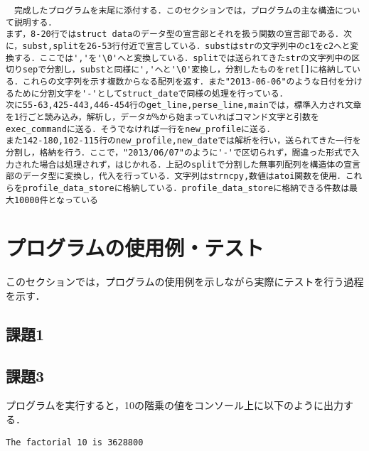 \documentclass[a4j]{jarticle}
\begin{document}
\begin{enumerate}
\begin{verbatim}
　完成したプログラムを末尾に添付する．このセクションでは，プログラムの主な構造について説明する．
まず，8-20行ではstruct dataのデータ型の宣言部とそれを扱う関数の宣言部である．次に，subst,splitを26-53行付近で宣言している．substはstrの文字列中のc1をc2へと変換する．ここでは','を'\0'へと変換している．splitでは送られてきたstrの文字列中の区切りsepで分割し，substと同様に','へと'\0'変換し，分割したものをret[]に格納している．これらの文字列を示す複数からなる配列を返す．また"2013-06-06"のような日付を分けるために分割文字を'-'としてstruct_dateで同様の処理を行っている．
次に55-63,425-443,446-454行のget_line,perse_line,mainでは，標準入力され文章を1行ごと読み込み，解析し，データが%から始まっていればコマンド文字と引数をexec_commandに送る．そうでなければ一行をnew_profileに送る．
また142-180,102-115行のnew_profile,new_dateでは解析を行い，送られてきた一行を分割し，格納を行う．ここで，"2013/06/07"のように'-'で区切られず，間違った形式で入力された場合は処理されず，はじかれる．上記のsplitで分割した無事列配列を構造体の宣言部のデータ型に変換し，代入を行っている．文字列はstrncpy,数値はatoi関数を使用．これらをprofile_data_storeに格納している．profile_data_storeに格納できる件数は最大10000件となっている

\end{verbatim}

%
%

\section{プログラムの使用例・テスト}

このセクションでは，プログラムの使用例を示しながら実際にテストを行う過程を示す．

\subsection{課題1}



\subsection{課題3}

プログラムを実行すると，10の階乗の値をコンソール上に以下のように出力する．

{\baselineskip 3mm
\begin{verbatim}
The factorial 10 is 3628800
\end{verbatim}
}




\end{enumerate}
\end{document}
